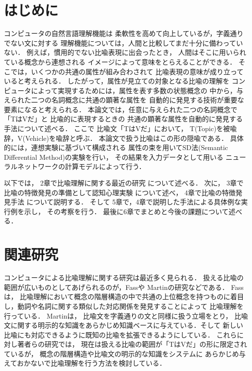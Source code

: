 

\maketitle


\section{はじめに}

コンピュータの自然言語理解機能は
柔軟性を高めて向上しているが，字義通りでない文に対する
理解機能については，人間と比較してまだ十分に備わっていない．
例えば，慣用的でない比喩表現に出会ったとき，
人間はそこに用いられている概念から連想される
イメージによって意味をとらえることができる．
そこでは，いくつかの共通の属性が組み合わされて
比喩表現の意味が成り立っていると考えられる．
したがって，属性が見立ての対象となる比喩の理解を
コンピュータによって実現するためには，属性を表す多数の状態概念の
中から，与えられた二つの名詞概念に共通の顕著な属性を
自動的に発見する技術が重要な要素になると考えられる．
本論文では，任意に与えられた二つの名詞概念で「TはVだ」と
比喩的に表現するときの
共通の顕著な属性を自動的に発見する手法について述べる．
ここで
比喩文「TはVだ」において，
T(Topic)を被喩辞，V(Vehicle)を喩辞と呼ぶ．
本論文で扱う比喩はこの形の隠喩である．
具体的には，連想実験に基づいて構成される
属性の束を用いてSD法(Semantic Differential Method)の実験を行い，
その結果を入力データとして用いる
ニューラルネットワークの計算モデルによって行う．

以下では，
2章で比喩理解に関する最近の研究
について述べる．
次に，
3章で比喩の特徴発見の準備として認知心理実験
について述べ，
4章で比喩の特徴発見手法
について説明する．
そして
5章で，4章で説明した手法による具体例な実行例を示し，
その考察を行う．
最後に6章でまとめと今後の課題について述べる．

\section{関連研究}

コンピュータによる比喩理解に関する研究は最近多く見られる．
扱える比喩の範囲が広いものとしてあげられるのが，Fass\cite{Fass1991}や
Martin\cite{Martin1992}の研究などである．
Fass\cite{Fass1991}は，
比喩理解において概念の階層構造の中で共通の上位概念を持つものに着目
し，動詞や名詞に関する類似した対応関係を発見することによって
比喩理解を行っている．
Martin\cite{Martin1992}は，
比喩文を字義通りの文と同様に扱う立場をとり，
比喩文に関する明示的な知識をあらかじめ知識ベースに与えている．そして
新しい比喩にも対応できるように既知の比喩を拡張できるようにしている．
これらに対し著者らの研究では，
現在は扱える比喩の範囲が「TはVだ」の形に限定されているが，
概念の階層構造や比喩文の明示的な知識をシステムに
あらかじめ与えておかないで比喩理解を行う方法を検討している．


